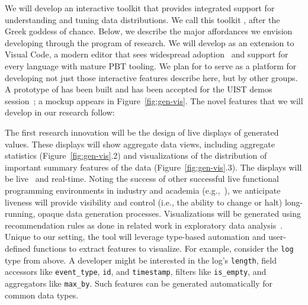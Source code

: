  { %
 We will develop an interactive toolkit that provides integrated
 support for understanding and tuning data distributions.
We call this toolkit \tyche{}, after the Greek goddess of
chance. Below, we describe the major affordances we envision
developing through the program of research. We will develop \tyche{}
as an extension to Visual Code, a modern editor that sees widespread
adoption~\cite{noauthor_stack_nodate} and support for every language
with mature PBT tooling. We plan for \tyche{} to serve as a platform
for developing not just those interactive features describe here, but
by other groups. A prototype of \tyche{} has been built and has been
accepted for the UIST demos session~\cite{ref:goldstein2023tyche}; a
mockup appears in Figure~\ref{fig:gen-vis}. The novel features that we
will develop in our research follow:

The first research innovation will be the design of live displays of generated
values. These displays
will show aggregate data views, including aggregate
statistics (Figure~\ref{fig:gen-vis}.2) and visualizations of the distribution
of important summary features of the data (Figure~\ref{fig:gen-vis}.3). The
displays will be live~\cite{ref:tanimoto1990viva} and real-time. Noting the
success of other successful live functional programming environments in industry
and academia
(e.g.,~\cite{tool:lighttable,ref:omar2019live}), we anticipate liveness will
provide visibility and control (i.e., the ability to change or halt)
long-running, opaque data generation processes.  Visualizations will be
generated using recommendation rules as done in related work in exploratory data
analysis~\cite{ref:lee2021lux,wongsuphasawat_voyager_2016,
wongsuphasawat_voyager_2017}. Unique to our setting, the tool will leverage
type-based automation and user-defined functions to extract features to
visualize.
For example, consider the
\lstinline{log} type
from above. A developer might be interested in the log's
\lstinline{length}, field accessors like \lstinline{event_type}, \lstinline{id},
and \lstinline{timestamp}, filters like \lstinline{is_empty}, and
aggregators like \lstinline{max_by}. Such features can be
generated automatically for common data types.

}
